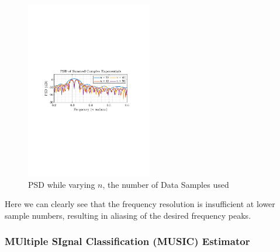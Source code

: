 \documentclass[12pt]{article}
\begin{document}
	\begin{figure}[H]%
		\begin{centering}
			\includegraphics[trim={2.2cm 11.2cm 3.15cm  11.2cm}, clip, width=0.49\textwidth]{../MATLAB/figures/q1_3d_fig01.pdf} 
		\end{centering}
	\captionsetup{justification=centering}
	\caption{PSD while varying $n$, the number of Data Samples used}
	\label{fig: 1-3d}
	\end{figure}
	
	Here we can clearly see that the frequency resolution is insufficient at lower sample numbers, resulting in aliasing of the desired frequency peaks.
	
	\subsubsection{MUltiple SIgnal Classification (MUSIC) Estimator}
	
\end{document}
